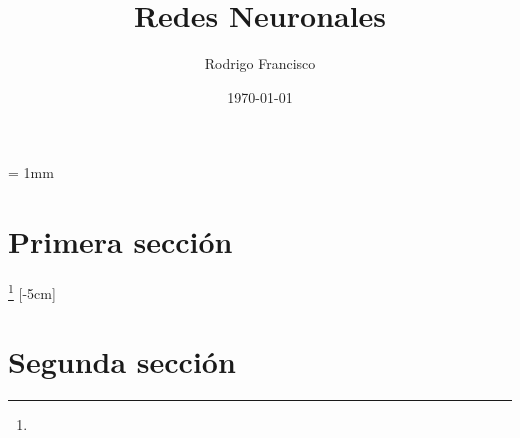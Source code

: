 \documentclass[a4paper,12pt]{article}
\author{Rodrigo Francisco} \let\authorref\@author
\title{Redes Neuronales} \let\titleref\@title
\date{\today} \let\dateref\@date
\begin{document}
  \coverpage%
  {
  \parskip = 1mm
  \tableofcontents
  }
  \begin{multicols}{2}
    \section{Primera sección}
    \lipsum\footnote{\lipsum[1][2]}
    [-5cm]
    \section{Segunda sección}
    \lipsum[1-4]
  \end{multicols}
\end{document}
